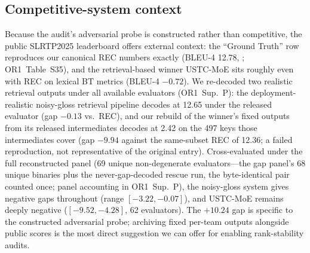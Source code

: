 \documentclass[pdflatex,sn-chicago]{sn-jnl}
\begin{document}
\subsection{Competitive-system context}
\label{sec:competition_real}
Because the audit's adversarial probe is constructed rather than competitive, the public SLRTP2025 leaderboard offers external context: the ``Ground Truth'' row reproduces our canonical REC numbers exactly (BLEU-4 12.78, \cite{slrtp2025}; OR1~Table~S35), and the retrieval-based winner USTC-MoE sits roughly even with REC on lexical BT metrics (BLEU-4 $-0.72$). We re-decoded two realistic retrieval outputs under all available evaluators (OR1~Sup.~P): the deployment-realistic noisy-gloss retrieval pipeline decodes at 12.65 under the released evaluator (gap $-0.13$ vs.\ REC), and our rebuild of the winner's fixed outputs from its released intermediates decodes at 2.42 on the 497 keys those intermediates cover (gap $-9.94$ against the same-subset REC of 12.36; a failed reproduction, not representative of the original entry). Cross-evaluated under the full reconstructed panel (69 unique non-degenerate evaluators---the gap panel's 68 unique binaries plus the never-gap-decoded rescue run, the byte-identical pair counted once; panel accounting in OR1~Sup.~P), the noisy-gloss system gives negative gaps throughout (range $[-3.22,-0.07]$), and USTC-MoE remains deeply negative ($[-9.52,-4.28]$, 62 evaluators). The $+10.24$ gap is specific to the constructed adversarial probe; archiving fixed per-team outputs alongside public scores is the most direct suggestion we can offer for enabling rank-stability audits.
\end{document}
